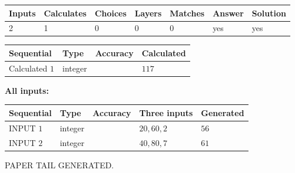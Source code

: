 \documentclass[12pt]{article}
\begin{document}
 
\noindent{}
 
 

 
   
   
   
   
\noindent\begin{tabular}{|l|l|l|l|l|l|l|}
 \hline
Inputs & Calculates & Choices & Layers & Matches & Answer & Solution \\ \hline
 2  & 
 1  & 
 0
  & 
 0  & 
 0  & 
  yes & 
  yes 
  \\ \hline
 \end{tabular}
   
   
   
   
\noindent{}
   
   
  
  
\noindent\begin{tabular}{|l|l|l|l|}
\hline
 Sequential & Type & Accuracy & Calculated \\ 
\hline
 
 
  Calculated $  1 $ & integer &  & 
  $ 117 $ 
 \\  \hline  
 \end{tabular}
   
   
   
   
\noindent\vspace{0.1in}\hspace{-0.08in} {\textbf{\Large{All inputs: }}}
   
   
  
  
\noindent\begin{tabular}{|l|l|l|l|l|}
\hline
 Sequential & Type & Accuracy & Three inputs & Generated \\ 
\hline
 
 
  INPUT $  1 $ & integer &  & $
 20
 , 
 60
 , 
 2
 $ & $ 56 $ 
 \\  \hline  
 
 
  INPUT $  2 $ & integer &  & $
 40
 , 
 80
 , 
 7
 $ & $ 61 $ 
 \\  \hline  
 \end{tabular}
   
   
   
   
   
   
 \vspace{0.2in}
 
   
   
\vspace{2.0in} PAPER TAIL GENERATED.
   
\end{document}

